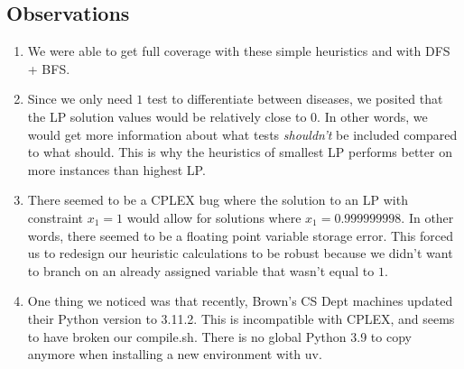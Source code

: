 \documentclass[11pt]{article}
\begin{document}
\subsection*{Observations}
\begin{enumerate}
    \item We were able to get full coverage with these simple heuristics and with DFS + BFS.
    \item Since we only need $1$ test to differentiate between diseases, we posited that the LP solution values would be relatively close to $0$. In other words, we would get more information about what tests \textit{shouldn't} be included compared to what should. This is why the heuristics of smallest LP performs better on more instances than highest LP.
    \item There seemed to be a CPLEX bug where the solution to an LP with constraint $x_1=1$ would allow 
    for solutions where $x_1=0.999999998$. In other words, there seemed to be a floating point variable
    storage error. This forced us to redesign our heuristic calculations to be robust because we didn't
    want to branch on an already assigned variable that wasn't equal to $1$.
    \item One thing we noticed was that recently, Brown's CS Dept machines updated their Python version
    to 3.11.2. This is incompatible with CPLEX, and seems to have broken our compile.sh. There is no
    global Python 3.9 to copy anymore when installing a new environment with uv.
\end{enumerate}
\end{document}
